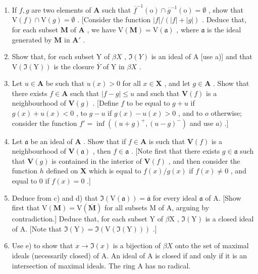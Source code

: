 \begin{enumerate}
\def\labelenumi{\alph{enumi})}
\item
  If \(f, g\) are two elements of \(\mathbf{A}\) such that \(\overline{f}^{-1}(\mathrm{o}) \cap \overline{g}^{-1}(\mathrm{o}) = \emptyset\) , show that \(\mathrm{V}(f) \cap \mathrm{V}(g) = \emptyset\) . {[}Consider the function \(|f| / (|f| + |g|)\) . Deduce that, for each subset \(\mathbf{M}\) of \(\mathbf{A}\) , we have \(\mathrm{V}(\mathbf{M}) = \mathrm{V}(\mathfrak{a})\) , where \(\mathfrak{a}\) is the ideal generated by \(\mathbf{M}\) in \(\mathbf{A}'\) .
\item
  Show that, for each subset Y of \(\beta X\) , \(\Im(Y)\) is an ideal of A {[}use a){]} and that \(\mathrm{V}(\Im(\mathrm{Y}))\) is the closure \(\overline{Y}\) of Y in \(\beta X\) .
\item
  Let \(u \in \mathbf{A}\) be such that \(u(x) > 0\) for all \(x \in \mathbf{X}\) , and let \(g \in \mathbf{A}\) . Show that there exists \(f \in \mathbf{A}\) such that \(|f - g| \leqslant u\) and such that \(\mathbf{V}(f)\) is a neighbourhood of \(\mathbf{V}(g)\) . {[}Define \(f\) to be equal to \(g + u\) if \(g(x) + u(x) < 0\) , to \(g - u\) if \(g(x) - u(x) > 0\) , and to \(o\) otherwise; consider the function \(f' = \inf ((u + g)^+, (u - g)^-)\) and use \(a)\) .{]}
\item
  Let \(\mathfrak{a}\) be an ideal of \(\mathbf{A}\) . Show that if \(f\in\mathbf{A}\) is such that \(\mathbf{V}(f)\) is a neighbourhood of \(\mathbf{V}(\mathfrak{a})\) , then \(f\in\mathfrak{a}\) . {[}Note first that there exists \(g \in \mathfrak{a}\) such that \(\mathbf{V}(g)\) is contained in the interior of \(\mathbf{V}(f)\) , and then consider the function \(h\) defined on \(\mathbf{X}\) which is equal to \(f(x) / g(x)\) if \(f(x) \neq 0\) , and equal to \(0\) if \(f(x) = 0\) .{]}
\item
  Deduce from c) and d) that \(\Im(\mathrm{V}(\mathfrak{a})) = \overline{\mathfrak{a}}\) for every ideal \(\mathfrak{a}\) of A. {[}Show first that \(\mathrm{V}(\mathbf{M}) = \mathrm{V}(\overline{\mathbf{M}})\) for all subsets M of A, arguing by contradiction.{]} Deduce that, for each subset Y of \(\beta\mathrm{X}\) , \(\Im(\mathrm{Y})\) is a closed ideal of A. {[}Note that \(\Im(\mathrm{Y}) = \Im(\mathrm{V}(\Im(\mathrm{Y})))\) .{]}
\item
  Use e) to show that \(x \to \Im(x)\) is a bijection of \(\beta X\) onto the set of maximal ideals (necessarily closed) of A. An ideal of A is closed if and only if it is an intersection of maximal ideals. The ring A has no radical.
\end{enumerate}


